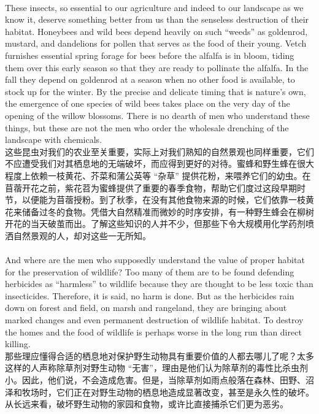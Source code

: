 \documentclass{article}
\begin{document}
\\
These insects, so essential to our agriculture and indeed to our landscape as we know it, deserve something better from us than the senseless destruction of their habitat. Honeybees and wild bees depend heavily on such “weeds” as goldenrod, mustard, and dandelions for pollen that serves as the food of their young. Vetch furnishes essential spring forage for bees before the alfalfa is in bloom, tiding them over this early season so that they are ready to pollinate the alfalfa. In the fall they depend on goldenrod at a season when no other food is available, to stock up for the winter. By the precise and delicate timing that is nature’s own, the emergence of one species of wild bees takes place on the very day of the opening of the willow blossoms. There is no dearth of men who understand these things, but these are not the men who order the wholesale drenching of the landscape with chemicals.\\
这些昆虫对我们的农业至关重要，实际上对我们熟知的自然景观也同样重要，它们不应遭受我们对其栖息地的无端破坏，而应得到更好的对待。蜜蜂和野生蜂在很大程度上依赖一枝黄花、芥菜和蒲公英等 “杂草” 提供花粉，来喂养它们的幼虫。在苜蓿开花之前，紫花苕为蜜蜂提供了重要的春季食物，帮助它们度过这段早期时节，以便能为苜蓿授粉。到了秋季，在没有其他食物来源的时候，它们依靠一枝黄花来储备过冬的食物。凭借大自然精准而微妙的时序安排，有一种野生蜂会在柳树开花的当天破茧而出。了解这些知识的人并不少，但那些下令大规模用化学药剂喷洒自然景观的人，却对这些一无所知。 \\

\\ 
And where are the men who supposedly understand the value of proper habitat for the preservation of wildlife? Too many of them are to be found defending herbicides as “harmless” to wildlife because they are thought to be less toxic than insecticides. Therefore, it is said, no harm is done. But as the herbicides rain down on forest and field, on marsh and rangeland, they are bringing about marked changes and even permanent destruction of wildlife habitat. To destroy the homes and the food of wildlife is perhaps worse in the long run than direct killing.\\
那些理应懂得合适的栖息地对保护野生动物具有重要价值的人都去哪儿了呢？太多这样的人声称除草剂对野生动物 “无害”，理由是他们认为除草剂的毒性比杀虫剂小。因此，他们说，不会造成危害。但是，当除草剂如雨点般落在森林、田野、沼泽和牧场时，它们正在对野生动物的栖息地造成显著改变，甚至是永久性的破坏。从长远来看，破坏野生动物的家园和食物，或许比直接捕杀它们更为恶劣。\\  
\end{document}
